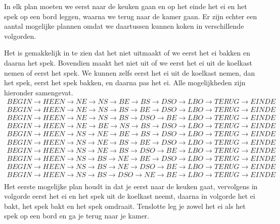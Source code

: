 \documentclass[alternative-exam.tex]{subfiles}
\begin{document}
In elk plan moeten we eerst naar de keuken gaan en op het einde het ei en het spek op een bord leggen, waarna we terug naar de kamer gaan. Er zijn echter een aantal mogelijke plannen omdat we daartussen kunnen koken in verschillende volgorden.

Het is gemakkelijk in te zien dat het niet uitmaakt of we eerst het ei bakken en daarna het spek. Bovendien maakt het niet uit of we eerst het ei uit de koelkast nemen of eerst het spek. We kunnen zelfs eerst het ei uit de koelkast nemen, dan het spek, eerst het spek bakken, en daarna pas het ei. Alle mogelijkheden zijn hieronder samengevat.
\[
\begin{array}{c}
BEGIN \rightarrow HEEN \rightarrow NE \rightarrow NS \rightarrow BE \rightarrow BS \rightarrow DSO\rightarrow LBO \rightarrow TERUG \rightarrow EINDE\\
BEGIN \rightarrow HEEN \rightarrow NE \rightarrow NS \rightarrow BS \rightarrow BE \rightarrow DSO\rightarrow LBO \rightarrow TERUG \rightarrow EINDE\\
BEGIN \rightarrow HEEN \rightarrow NE \rightarrow NS \rightarrow BS \rightarrow DSO \rightarrow BE\rightarrow LBO \rightarrow TERUG \rightarrow EINDE\\
BEGIN \rightarrow HEEN \rightarrow NE \rightarrow BE \rightarrow NS \rightarrow BS \rightarrow DSO\rightarrow LBO \rightarrow TERUG \rightarrow EINDE\\
BEGIN \rightarrow HEEN \rightarrow NS \rightarrow NE \rightarrow BE \rightarrow BS \rightarrow DSO\rightarrow LBO \rightarrow TERUG \rightarrow EINDE\\
BEGIN \rightarrow HEEN \rightarrow NS \rightarrow NE \rightarrow BS \rightarrow BE \rightarrow DSO\rightarrow LBO \rightarrow TERUG \rightarrow EINDE\\
BEGIN \rightarrow HEEN \rightarrow NS \rightarrow NE \rightarrow BS \rightarrow DSO \rightarrow BE\rightarrow LBO \rightarrow TERUG \rightarrow EINDE\\
BEGIN \rightarrow HEEN \rightarrow NS \rightarrow BS \rightarrow NE \rightarrow BE \rightarrow DSO\rightarrow LBO \rightarrow TERUG \rightarrow EINDE\\
BEGIN \rightarrow HEEN \rightarrow NS \rightarrow BS \rightarrow NE \rightarrow DSO \rightarrow BE\rightarrow LBO \rightarrow TERUG \rightarrow EINDE\\
BEGIN \rightarrow HEEN \rightarrow NS \rightarrow BS \rightarrow DSO \rightarrow NE \rightarrow BE\rightarrow LBO \rightarrow TERUG \rightarrow EINDE\\
\end{array}
\]
Het eerste mogelijke plan houdt in dat je eerst naar de keuken gaat, vervolgens in volgorde eerst het ei en het spek uit de koelkast neemt, daarna in volgorde het ei bakt, het spek bakt en het spek omdraait. Tenslotte leg je zowel het ei als het spek op een bord en ga je terug naar je kamer.
\end{document}

